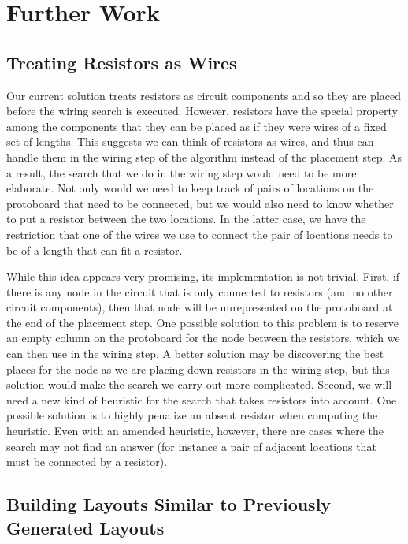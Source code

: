 \section{Further Work}

\subsection{Treating Resistors as Wires}

Our current solution treats resistors as circuit components and so they are
placed before the wiring search is executed.
However, resistors have the special property among the components that
they can be placed as if they were wires of a fixed set of lengths.
This suggests we can think of resistors as wires,
and thus can handle them in the wiring step of the algorithm instead of
the placement step. As a result, the search that we do in the wiring step would
need to be
more elaborate. Not only would we need to keep track of pairs of locations on the
protoboard that need to be connected, but we would also need to know whether to
put a resistor between the two locations. In the latter case, we have the
restriction that one of the wires we use to connect the pair of locations needs
to be of a length that can fit a resistor.

While this idea appears very promising, its implementation is not trivial.
First, if there is any node in the circuit that is only
connected to resistors (and no other circuit components), then that node will be
unrepresented on the protoboard at the end of the placement step. One possible
solution to this problem is to reserve an empty column on the
protoboard for the node between the resistors, which we can then use in the
wiring step. A better solution may
be discovering the best places for the node as we are placing down resistors in
the wiring step, but this solution would make the search we carry out
more complicated. Second, we will need a new kind of heuristic for the
search that takes resistors into account. One possible solution is to highly
penalize an absent resistor when computing the heuristic.
Even with an amended heuristic, however, there
are cases where the search may not find an answer (for instance a pair of
adjacent locations that must be connected by a resistor).

\subsection{Building Layouts Similar to Previously Generated Layouts}

